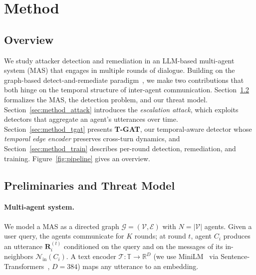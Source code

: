 \section{Method}
\label{sec:method}


\subsection{Overview}
\label{sec:method_overview}
We study attacker detection and remediation in an LLM-based multi-agent system
(MAS) that engages in multiple rounds of dialogue. Building on the graph-based
detect-and-remediate paradigm~\citep{wang2025gsafeguard}, we make two
contributions that both hinge on the temporal structure of inter-agent
communication. Section~\ref{sec:method_prelim} formalizes the MAS, the
detection problem, and our threat model. Section~\ref{sec:method_attack}
introduces the \emph{escalation attack}, which exploits detectors that aggregate
an agent's utterances over time. Section~\ref{sec:method_tgat} presents
\textbf{T-GAT}, our temporal-aware detector whose \emph{temporal edge encoder}
preserves cross-turn dynamics, and Section~\ref{sec:method_train} describes
per-round detection, remediation, and training. Figure~\ref{fig:pipeline} gives
an overview.

\subsection{Preliminaries and Threat Model}
\label{sec:method_prelim}

\paragraph{Multi-agent system.}
We model a MAS as a directed graph $\mathcal{G}=(\mathcal{V},\mathcal{E})$ with
$N=|\mathcal{V}|$ agents. Given a user query, the agents communicate for $K$
rounds; at round $t$, agent $C_i$ produces an utterance $\mathbf{R}_i^{(t)}$
conditioned on the query and on the messages of its in-neighbors
$\mathcal{N}_{\text{in}}(C_i)$. A text encoder
$\mathcal{T}:\mathbb{T}\rightarrow\mathbb{R}^{D}$ (we use
MiniLM~\citep{wang2020minilm} via Sentence-Transformers~\citep{reimers2019sentencebert},
$D{=}384$) maps any utterance to an embedding.

